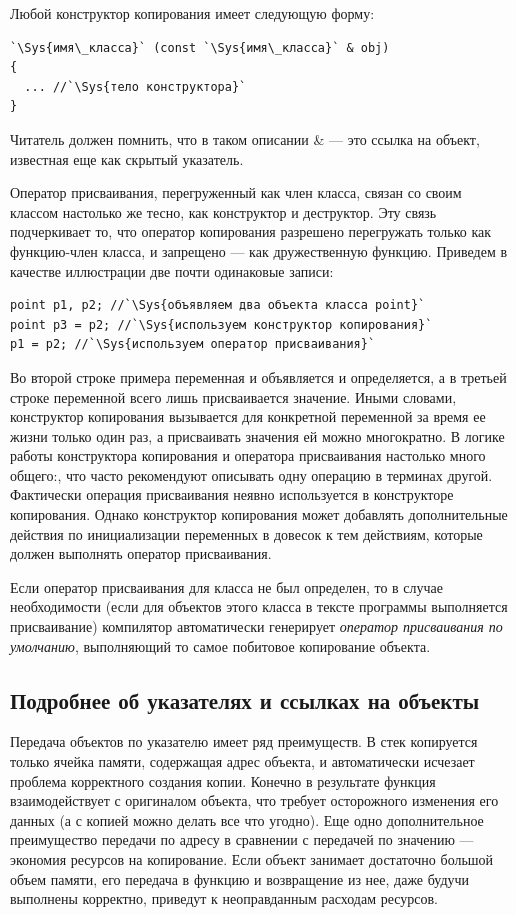 Любой конструктор копирования имеет следующую форму:
\begin{lstlisting}
`\Sys{имя\_класса}` (const `\Sys{имя\_класса}` & obj) 
{
  ... //`\Sys{тело конструктора}`
}
\end{lstlisting}

Читатель должен помнить, что в таком описании \& --- это ссылка на объект, известная еще
как скрытый указатель.

Оператор присваивания, перегруженный как член класса, связан со своим классом настолько же тесно, как конструктор и
деструктор. Эту связь подчеркивает то, что оператор копирования разрешено перегружать только как функцию-член класса, и
запрещено --- как дружественную функцию. Приведем в качестве иллюстрации две почти одинаковые записи:
\begin{lstlisting}
point p1, p2; //`\Sys{объявляем два объекта класса point}`
point p3 = p2; //`\Sys{используем конструктор копирования}`
p1 = p2; //`\Sys{используем оператор присваивания}`
\end{lstlisting}

Во второй строке примера переменная   и объявляется и определяется, а в третьей  строке
переменной  всего лишь присваивается значение. Иными словами, конструктор копирования
вызывается для конкретной переменной за время ее жизни только один раз, а присваивать значения ей можно многократно. В
логике работы конструктора копирования и оператора присваивания настолько много общего:, что часто рекомендуют
описывать одну операцию в терминах другой. Фактически операция  присваивания неявно используется в конструкторе
копирования. Однако конструктор копирования может добавлять дополнительные действия по инициализации переменных в
довесок к тем действиям, которые должен выполнять оператор присваивания.

Если оператор присваивания для класса не был определен, то в случае необходимости (если для объектов этого класса в
тексте программы выполняется присваивание) компилятор автоматически генерирует \emph{оператор присваивания
по умолчанию},  выполняющий то самое побитовое копирование объекта.

\subsection[Подробнее об указателях и ссылках на объекты]{Подробнее об указателях и ссылках на объекты}\label{ch10:2.2}

Передача объектов по указателю имеет ряд преимуществ.  В стек копируется только
ячейка памяти, содержащая адрес объекта, и автоматически исчезает проблема корректного создания копии. Конечно в
результате функция взаимодействует с оригиналом объекта, что требует осторожного изменения его данных (а с копией можно
делать все что угодно). Еще одно дополнительное преимущество передачи по адресу в сравнении с передачей по значению ---
экономия ресурсов на копирование. Если объект занимает достаточно большой объем памяти, его передача в функцию и
возвращение из нее, даже будучи выполнены корректно, приведут к неоправданным расходам ресурсов.

